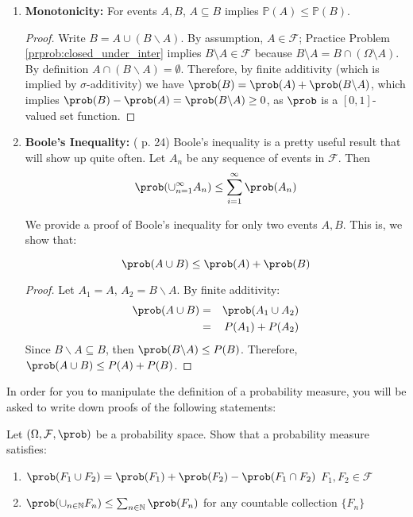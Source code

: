 \documentclass[11pt]{article} %
\begin{document}
\begin{enumerate}

\item \textbf{Monotonicity:} For events $A,B$, $A \subseteq B$ implies $\mathbb{P}(A) \leq \mathbb{P}(B)$.

\begin{proof}
Write $B= A \cup (B \backslash A)$. By assumption, $A\in \mathcal{F}$; Practice Problem \ref{prprob:closed_under_inter} implies $B\setminus
A \in \mathcal{F}$ because $B\setminus A = B
\cap \left( \Omega\setminus A \right)$. By definition $A \cap (B\backslash
A)=\emptyset$.  Therefore, by finite additivity (which is implied by $\sigma$-additivity) we have $\prob(B)=\prob(A) + \prob(B \backslash A)$, which implies $\prob(B)-\prob(A)= \prob(B \backslash A) \geq 0$, as $\prob$ is a $[0,1]$-valued set function.  
\end{proof}

\item \textbf{Boole's Inequality:} (\cite{Billingsley95} p. 24) Boole's inequality is a pretty useful result that will show up quite often.  Let $A_n$ be any sequence of events in $\mathcal{F}$. Then
$$\prob(\cup_{n=1}^{\infty} A_n) \leq \sum_{i=1}^{\infty} \prob(A_n)  $$

We provide a proof of Boole's inequality for only two events $A,B$. This is, we show that:

$$\prob(A \cup B) \leq \prob(A) + \prob(B) $$

\begin{proof}
Let $A_1=A$, $A_2=B \backslash A$. By finite additivity:
\begin{eqnarray*}
\prob(A \cup B) &=& \prob(A_1 \cup A_2)\\
&=& P(A_1) + P(A_2)   
\end{eqnarray*}
Since $B \backslash A \subseteq B$, then $\prob(B\backslash A) \leq P(B)$. Therefore, $\prob(A \cup B) \leq P(A) + P(B)$. 
\end{proof}

\end{enumerate}

In order for you to manipulate the definition of a probability measure, you will be asked to write down proofs of the following statements:\\

\noindent\begin{prproblem} Let $(\Omega, \mathcal{F}, \prob)$ be a probability space. Show that a probability measure satisfies:
\begin{enumerate}
\item $\prob(F_1 \cup F_2) = \prob(F_1) + \prob(F_2) - \prob(F_1 \cap F_2)$  $F_1,F_2 \in \mathcal{F}$
\item $\prob(\cup_{n \in \mathbb{N}} F_n) \leq \sum_{n \in \mathbb{N}} \prob(F_n) $ for any countable collection $\{F_n\}$
\end{enumerate}
\end{prproblem}
\end{document}
